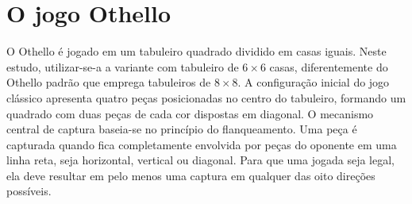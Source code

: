 \documentclass[12pt]{article}
\begin{document}
 
 
 
\section{O jogo Othello}
 
O Othello é jogado em um tabuleiro quadrado dividido em casas iguais. Neste estudo, utilizar-se-a
a variante com tabuleiro de $6\!\times\!6$ casas, diferentemente do Othello padrão que emprega
tabuleiros de $8\!\times\!8$. A configuração inicial do jogo clássico apresenta quatro peças
posicionadas no centro do tabuleiro, formando um quadrado com duas peças de cada cor dispostas
em diagonal. O mecanismo central de captura baseia-se no princípio do flanqueamento. Uma peça
é capturada quando fica completamente envolvida por peças do oponente em uma linha reta, seja
horizontal, vertical ou diagonal. Para que uma jogada seja legal, ela deve resultar em pelo menos
uma captura em qualquer das oito direções possíveis.
 
\end{document}
